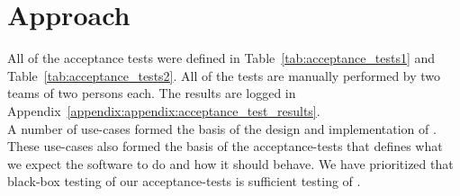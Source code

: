 \section{Approach}
\label{sec:testing_approach}

All of the acceptance tests were defined in Table~\ref{tab:acceptance_tests1} and Table~\ref{tab:acceptance_tests2}.
All of the tests are manually performed by two teams of two persons each.
The results are logged in Appendix~\ref{appendix:appendix:acceptance_test_results}. \\

A number of use-cases formed the basis of the design and implementation of \projectname{}.
These use-cases also formed the basis of the acceptance-tests that defines what we expect the software to do and how it should behave. 
We have prioritized that black-box testing of our acceptance-tests is sufficient testing of \projectname{}.

